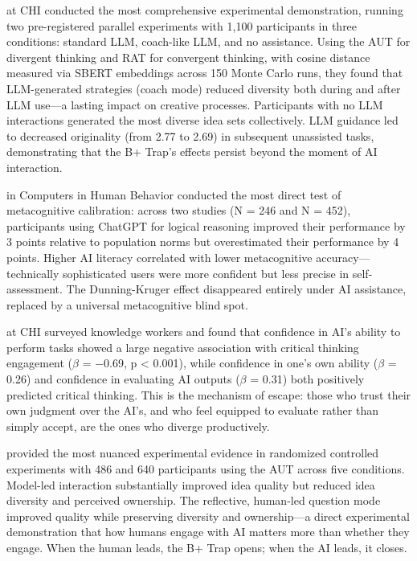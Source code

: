 \documentclass[12pt,a4paper]{article}
\begin{document}
\citet{kumar2025} at CHI conducted the most comprehensive experimental demonstration, running two pre-registered parallel experiments with 1,100 participants in three conditions: standard LLM, coach-like LLM, and no assistance. Using the AUT for divergent thinking and RAT for convergent thinking, with cosine distance measured via SBERT embeddings across 150 Monte Carlo runs, they found that LLM-generated strategies (coach mode) reduced diversity both during and after LLM use---a lasting impact on creative processes. Participants with no LLM interactions generated the most diverse idea sets collectively. LLM guidance led to decreased originality (from 2.77 to 2.69) in subsequent unassisted tasks, demonstrating that the B+ Trap's effects persist beyond the moment of AI interaction.

\citet{fernandes2026} in Computers in Human Behavior conducted the most direct test of metacognitive calibration: across two studies (N = 246 and N = 452), participants using ChatGPT for logical reasoning improved their performance by 3 points relative to population norms but overestimated their performance by 4 points. Higher AI literacy correlated with lower metacognitive accuracy---technically sophisticated users were more confident but less precise in self-assessment. The Dunning-Kruger effect disappeared entirely under AI assistance, replaced by a universal metacognitive blind spot.

\citet{lee2025} at CHI surveyed knowledge workers and found that confidence in AI's ability to perform tasks showed a large negative association with critical thinking engagement ($\beta$ = $-$0.69, p < 0.001), while confidence in one's own ability ($\beta$ = 0.26) and confidence in evaluating AI outputs ($\beta$ = 0.31) both positively predicted critical thinking. This is the mechanism of escape: those who trust their own judgment over the AI's, and who feel equipped to evaluate rather than simply accept, are the ones who diverge productively.

\citet{maier2025} provided the most nuanced experimental evidence in randomized controlled experiments with 486 and 640 participants using the AUT across five conditions. Model-led interaction substantially improved idea quality but reduced idea diversity and perceived ownership. The reflective, human-led question mode improved quality while preserving diversity and ownership---a direct experimental demonstration that how humans engage with AI matters more than whether they engage. When the human leads, the B+ Trap opens; when the AI leads, it closes.
\end{document}
